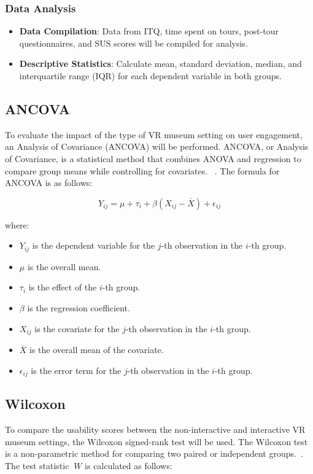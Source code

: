 \documentclass[conference]{IEEEtran}
\begin{document}
\subsubsection{Data Analysis}
\begin{itemize}
    \item \textbf{Data Compilation}: Data from ITQ, time spent on tours, post-tour questionnaires, and SUS scores will be compiled for analysis.
    \item \textbf{Descriptive Statistics}: Calculate mean, standard deviation, median, and interquartile range (IQR) for each dependent variable in both groups.
\end{itemize}
\subsection{ANCOVA}

To evaluate the impact of the type of VR museum setting on user engagement, an Analysis of Covariance (ANCOVA) will be performed. ANCOVA, or Analysis of Covariance, is a statistical method that combines ANOVA and regression to compare group means while controlling for covariates. ~\cite{goldberg2020anova}. The formula for ANCOVA is as follows:

\[ Y_{ij} = \mu + \tau_i + \beta(X_{ij} - \overline{X}) + \epsilon_{ij} \]

where:
\begin{itemize}
    \item \( Y_{ij} \) is the dependent variable for the \( j \)-th observation in the \( i \)-th group.
    \item \( \mu \) is the overall mean.
    \item \( \tau_i \) is the effect of the \( i \)-th group.
    \item \( \beta \) is the regression coefficient.
    \item \( X_{ij} \) is the covariate for the \( j \)-th observation in the \( i \)-th group.
    \item \( \overline{X} \) is the overall mean of the covariate.
    \item \( \epsilon_{ij} \) is the error term for the \( j \)-th observation in the \( i \)-th group.
\end{itemize}

\subsection{Wilcoxon}
To compare the usability scores between the non-interactive and interactive VR museum settings, the Wilcoxon signed-rank test will be used. The Wilcoxon test is a non-parametric method for comparing two paired or independent groups.~\cite{kishore2022statistics}. The test statistic \( \ W \) is calculated as follows:
\end{document}
